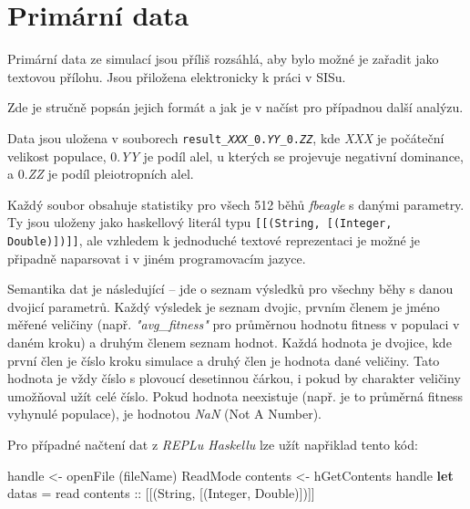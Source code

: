 \section{Primární data}
\label{sec:primarydata}

Primární data ze simulací jsou příliš rozsáhlá, aby bylo možné je zařadit jako textovou přílohu. Jsou přiložena elektronicky k práci v SISu.

Zde je stručně popsán jejich formát a jak je v načíst pro případnou další analýzu.

Data jsou uložena v souborech \texttt{result\_\textit{XXX}\_0.\textit{YY}\_0.\textit{ZZ}}, kde
\textit{XXX} je počáteční velikost populace,
0.\textit{YY} je podíl alel, u kterých se projevuje negativní dominance,
a 0.\textit{ZZ} je podíl pleiotropních alel.

Každý soubor obsahuje statistiky pro všech 512 běhů \textit{fbeagle} s danými parametry. Ty jsou uloženy jako
haskellový literál typu \texttt{[[(String, [(Integer, Double)])]]}, ale vzhledem k jednoduché textové
reprezentaci je možné je připadně naparsovat i v jiném programovacím jazyce.

Semantika dat je následující -- jde o seznam výsledků pro všechny běhy s danou dvojicí parametrů. Každý výsledek
je seznam dvojic, prvním členem je jméno měřené veličiny (např. \textit{"avg\_fitness"} pro průměrnou hodnotu
fitness v populaci v daném kroku) a druhým členem seznam hodnot. Každá hodnota je dvojice, kde první člen je
číslo kroku simulace a druhý člen je hodnota dané veličiny. Tato hodnota je vždy číslo s plovoucí desetinnou čárkou,
i pokud by charakter veličiny umožňoval užít celé číslo. Pokud hodnota neexistuje (např. je to průměrná fitness vyhynulé
populace), je hodnotou \textit{NaN} (Not A Number).

Pro případné načtení dat z \textit{REPLu Haskellu} lze užít napřiklad tento kód:

\begin{code}[commandchars=\\\{\}]
handle <- openFile (fileName) ReadMode
contents <- hGetContents handle
\textbf{let}
        datas = read contents :: [[(String, [(Integer, Double)])]]
\end{code}
